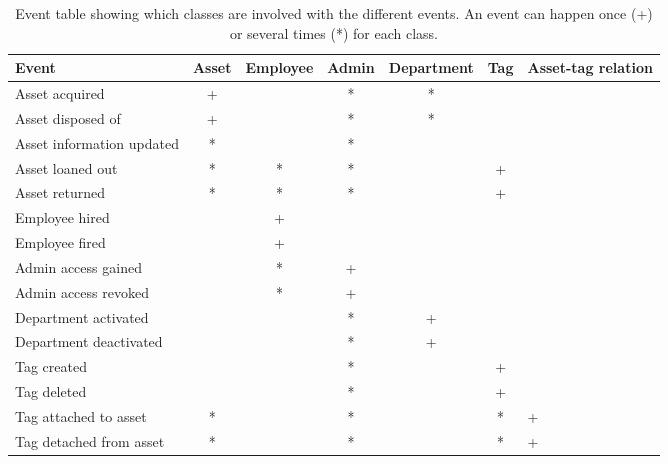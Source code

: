 \begin{table}[H]
\centering
    \begin{tabular}{|l||c|c|c|c|c||p{1.8cm}|}
        \hline
        \textbf{Event} & \textbf{Asset} & \textbf{Employee} & \textbf{Admin} & \textbf{Department} & \textbf{Tag} & \hfil \textbf{Asset-tag \newline \hfil relation}\\
        \hline
        \hline
        Asset acquired & + & & * & * & & \\
        \hline
        Asset disposed of & + & & * & * & & \\
        \hline
        Asset information updated & * & & * & & & \\
        \hline
        Asset loaned out & * & * & * & & + & \\
        \hline
        Asset returned & * & * & * & & + & \\
        \hline
        Employee hired & & + & & & & \\
        \hline
        Employee fired & & + & & & & \\
        \hline
        Admin access gained & & * & + & & & \\
        \hline
        Admin access revoked & & * & + & & & \\
        \hline
        Department activated & & & * & + & & \\
        \hline
        Department deactivated & & & * & + & & \\
        \hline
        Tag created & & & * & & + & \\
        \hline
        Tag deleted & & & * & & + & \\
        \hline
        Tag attached to asset & * & & * & & * & \hfil +\\
        \hline
        Tag detached from asset & * & & * & & * & \hfil +\\
        \hline
    \end{tabular}
\caption{Event table showing which classes are involved with the different events. An event can happen once (+) or several times (*) for each class.}\label{tab:events}
\end{table}
\par


